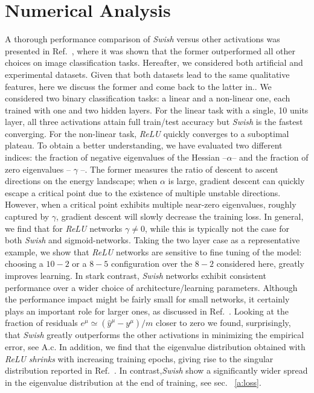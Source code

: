 \documentclass{article}
\begin{document}
\section{Numerical Analysis}
%
A thorough performance comparison of {\it Swish} versus other activations was presented in Ref.~\cite{prajit}, where it was shown that the former outperformed all other choices on image classification tasks. Hereafter,  we considered both artificial and experimental datasets. Given that both datasets lead to the same qualitative features, here we discuss the former and come back to the latter in.. We considered two binary classification tasks: a linear and a non-linear one, each trained with one and two hidden layers. For the linear task with a single, 10 units layer, all three activations attain full train/test accuracy but {\it Swish} is the fastest converging.  For the non-linear task, {\it ReLU} quickly converges to a suboptimal plateau. To obtain a better understanding, we have evaluated two different indices: the fraction of negative eigenvalues of the Hessian --$\alpha$-- and the fraction of zero eigenvalues -- $\gamma$ --. The former measures the ratio of descent to ascent directions on the energy landscape; when $\alpha$ is large, gradient descent can quickly escape a critical point due to the existence of multiple unstable directions. However, when a critical point exhibits multiple near-zero eigenvalues, roughly captured by $\gamma$, gradient descent will slowly decrease the training loss.
In general, we find that for {\it ReLU} networks $\gamma \neq 0$, while this is typically not the case for both {\it Swish} and sigmoid-networks. Taking the two layer case as a representative example, we show that {\it ReLU} networks are sensitive to fine tuning of the model: choosing a $10-2$ or a $8-5$ configuration over the $8-2$ considered here, greatly improves learning. In stark contrast, {\it Swish} networks exhibit consistent performance over a wider choice of architecture/learning parameters. Although the performance impact might be fairly small for small networks, it certainly plays an important role for larger ones, as discussed in Ref.~\cite{prajit}. Looking at the fraction of residuals $e^{\mu} \simeq (\hat{y}^{\mu} - y^{\mu})/m$ closer to zero we found, surprisingly, that {\it Swish} greatly outperforms the other activations in minimizing the empirical error, see A.c.
%
In addition, we find that the eigenvalue distribution obtained with {\it ReLU}  {\it shrinks} with increasing training epochs, giving rise to the singular distribution reported in Ref.~\cite{penn1, levent}. In contrast,{\it Swish} show a significantly wider spread in the eigenvalue distribution at the end of training, see sec. ~\eqref{a:loss}.
\end{document}
